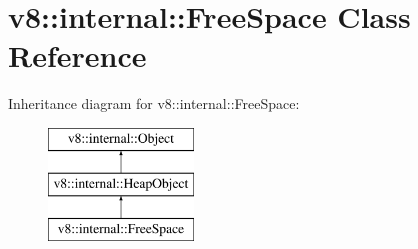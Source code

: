 \hypertarget{classv8_1_1internal_1_1FreeSpace}{}\section{v8\+:\+:internal\+:\+:Free\+Space Class Reference}
\label{classv8_1_1internal_1_1FreeSpace}
Inheritance diagram for v8\+:\+:internal\+:\+:Free\+Space\+:\begin{figure}[H]
\begin{center}
\leavevmode
\includegraphics[height=3.000000cm]{classv8_1_1internal_1_1FreeSpace}
\end{center}
\end{figure}

